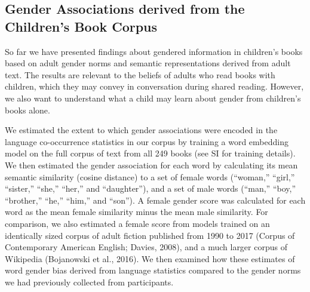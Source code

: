 \documentclass[english,,man,floatsintext]{apa6}
\begin{document}
\hypertarget{gender-associations-derived-from-the-childrens-book-corpus}{%
\subsection{Gender Associations derived from the Children's Book Corpus}\label{gender-associations-derived-from-the-childrens-book-corpus}}

So far we have presented findings about gendered information in children's books based on adult gender norms and semantic representations derived from adult text. The results are relevant to the beliefs of adults who read books with children, which they may convey in conversation during shared reading. However, we also want to understand what a child may learn about gender from children's books alone.

We estimated the extent to which gender associations were encoded in the language co-occurrence statistics in our corpus by training a word embedding model on the full corpus of text from all 249 books (see SI for training details). We then estimated the gender association for each word by calculating its mean semantic similarity (cosine distance) to a set of female words (\enquote{woman,} \enquote{girl,} \enquote{sister,} \enquote{she,} \enquote{her,} and \enquote{daughter}), and a set of male words (\enquote{man,} \enquote{boy,} \enquote{brother,} \enquote{he,} \enquote{him,} and \enquote{son}). A female gender score was calculated for each word as the mean female similarity minus the mean male similarity. For comparison, we also estimated a female score from models trained on an identically sized corpus of adult fiction published from 1990 to 2017 (Corpus of Contemporary American English; Davies, 2008), and a much larger corpus of Wikipedia (Bojanowski et al., 2016). We then examined how these estimates of word gender bias derived from language statistics compared to the gender norms we had previously collected from participants.
\end{document}
